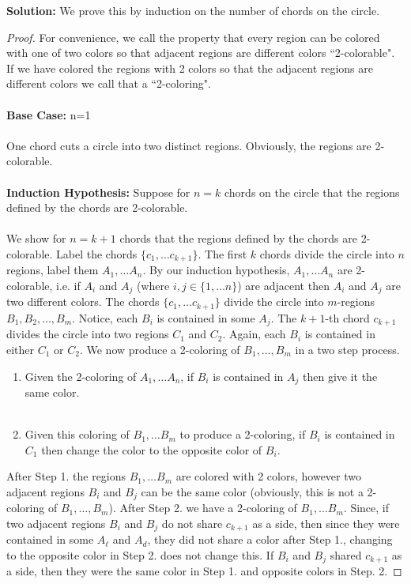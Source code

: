 \documentclass[12pt,letterpaper]{article}
\theoremstyle{plain}
\theoremstyle{definition}
\begin{document}
\begin{enumerate}[1.]
{\bf Solution:} We prove this by induction on the number of chords on the circle.
\begin{proof}
For convenience, we call the property that every region can be colored with one of two colors so that adjacent regions are different colors ``2-colorable". If we have colored the regions with 2 colors so that the adjacent regions are different colors we call that a ``2-coloring". \\
\ \\
{\bf Base Case:} n=1\\
\ \\
One chord cuts a circle into two distinct regions. Obviously, the regions are 2-colorable.\ \\
\ \\
{\bf Induction Hypothesis:} Suppose for $n=k$ chords on the circle that the regions defined by the chords are 2-colorable. \\
\ \\
We show for $n=k+1$ chords that the regions defined by the chords are 2-colorable. Label the chords $\{c_1,\ldots c_{k+1}\}$. The first $k$ chords divide the circle into $n$ regions, label them $A_1, \ldots A_n$. By our induction hypothesis, $A_1, \ldots A_n$ are 2-colorable, i.e. if $A_i$ and $A_j$ (where $i,j\in \{1,\ldots n\}$) are adjacent then $A_i$ and $A_j$ are two different colors. The chords $\{c_1,\ldots c_{k+1}\}$ divide the circle into $m$-regions $B_1, B_2, \ldots, B_m$. Notice, each $B_i$ is contained in some $A_j$. The $k+1$-th chord $c_{k+1}$ divides the circle into two regions $C_1$ and $C_2$. Again, each $B_i$ is contained in either $C_1$ or $C_2$. We now produce a 2-coloring of $B_1, \ldots, B_m$ in a two step process.
\begin{enumerate}[Step 1.]
\item  Given the 2-coloring of $A_1, \ldots A_n$, if $B_i$ is contained in $A_j$ then give it the same color. \\
\ \\
\item Given this coloring of $B_1, \ldots B_m$ to produce a 2-coloring, if $B_i$ is contained in $C_1$ then change the color to the opposite color of $B_i$.\\
 \end{enumerate}
 \newpage
 After Step 1. the regions $B_1, \ldots B_m$ are colored with 2 colors, however two adjacent regions $B_i$ and $B_j$ can be the same color (obviously, this is not a 2-coloring of $B_1, \ldots, B_m$). After Step 2. we have a 2-coloring of $B_1, \ldots B_m$. Since, if two adjacent regions $B_i$ and $B_j$ do not share $c_{k+1}$ as a side, then since they were contained in some $A_\ell$ and $A_d$, they did not share a color after Step 1., changing to the opposite color in Step 2. does not change this. If $B_i$ and $B_j$ shared $c_{k+1}$  as a side, then they were the same color in Step 1. and opposite colors in Step. 2.  
\end{proof}


\end{enumerate}
\end{document}
